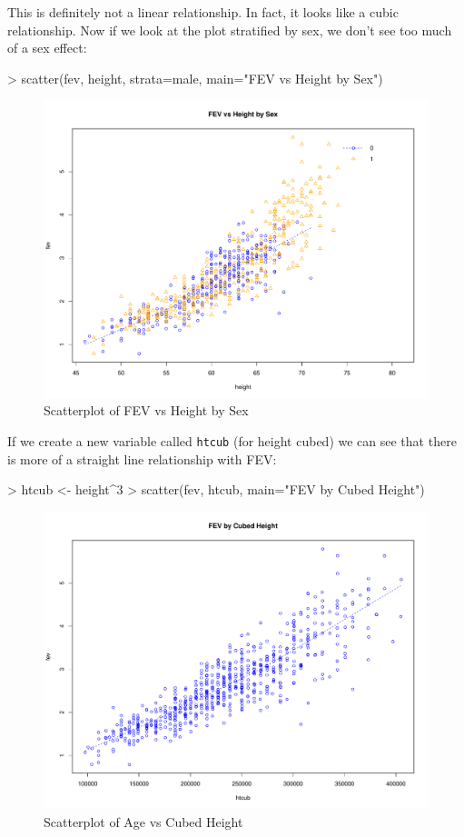 \documentclass[landscape]{article}
\renewenvironment{Schunk}{\vspace{\topsep}}{\vspace{\topsep}}
\begin{document}
This is definitely not a linear relationship. In fact, it looks like a cubic relationship. Now if we look at the plot stratified by sex, we don't see too much of a sex effect:\\
\begin{Schunk}
\begin{Sinput}
> scatter(fev, height, strata=male, main="FEV vs Height by Sex")
\end{Sinput}
\end{Schunk}
\begin{figure}[h]
\centering
\includegraphics[scale=.005]{fevdoc-heightfevscatter2}
\caption{Scatterplot of FEV vs Height by Sex}
\label{heightfevscatter2}
\end{figure}
If we create a new variable called \texttt{htcub} (for height cubed) we can see that there is more of a straight line relationship with FEV:
\begin{Schunk}
\begin{Sinput}
> htcub <- height^3
> scatter(fev, htcub, main="FEV by Cubed Height")
\end{Sinput}
\end{Schunk}
\begin{figure}[h]
\centering
\includegraphics[scale=.005]{fevdoc-heightfevscatter3}
\caption{Scatterplot of Age vs Cubed Height}
\label{heightfevscatter3}
\end{figure}
\end{document}

